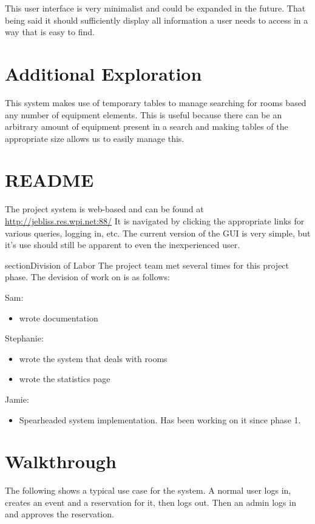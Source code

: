 \documentclass{article}
\begin{document}
This user interface is very minimalist and could be expanded in the future. That being said it should sufficiently display
all information a user needs to access in a way that is easy to find.

\section{Additional Exploration}
This system makes use of temporary tables to manage searching for rooms based any number of equipment elements. This is
useful because there can be an arbitrary amount of equipment present in a search and making tables of the appropriate size
allows us to easily manage this.

\section{README}
The project system is web-based and can be found at \url{http://jebliss.res.wpi.net:88/}
It is navigated by clicking the appropriate links for various queries, logging in, etc.
The current version of the GUI is very simple, but it's use should still be apparent to even the inexperienced user.

section{Division of Labor}
The project team met several times for this project phase. The devision of work on is as follows:

Sam:
\begin{itemize}
\item wrote documentation
\end{itemize}

Stephanie:
\begin{itemize}
\item wrote the system that deals with rooms
\item wrote the statistics page
\end{itemize}

Jamie:
\begin{itemize}
\item Spearheaded system implementation. Has been working on it since phase 1.
\end{itemize}

\appendix
\section{Walkthrough}
The following shows a typical use case for the system.
A normal user logs in, creates an event and a reservation for it, then logs out.
Then an admin logs in and approves the reservation.
\end{document}
